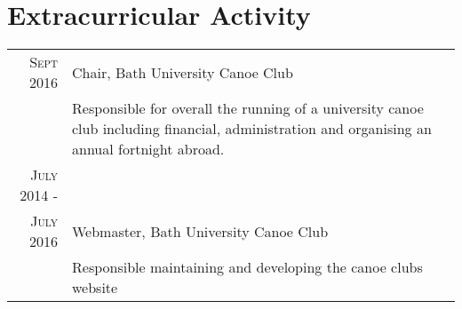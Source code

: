 \documentclass[a4paper,12pt]{article}
\begin{document}
\section{Extracurricular Activity}
\begin{tabular}{rp{11cm}}
 \textsc{Sept} 2016 & Chair, Bath University Canoe Club\\& \footnotesize{Responsible for overall the running of a university canoe club including financial, administration and organising an annual fortnight  abroad.} \\
 \textsc{July} 2014 -\\ \textsc{July} 2016 & Webmaster, Bath University Canoe Club\\ &\footnotesize{Responsible maintaining and developing the canoe clubs website}
\end{tabular}



\end{document}
